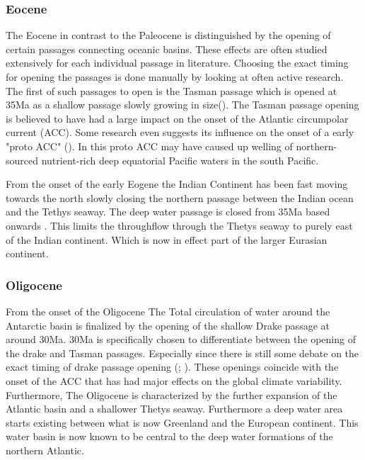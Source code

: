 \begin{multicols}{2}
\subsubsection{Eocene}
The Eocene in contrast to the Paleocene is distinguished by the opening of certain passages connecting oceanic basins. These effects are often studied extensively for each individual passage in literature. Choosing the exact timing for opening the passages is done manually by looking at often active research. The first of such passages to open is the Tasman passage which is opened at 35Ma as a shallow passage slowly growing in size(\cite{Lawver2003Sep}). The Tasman passage opening is believed to have had a large impact on the onset of the Atlantic circumpolar current (ACC). Some research even suggests its influence on the onset of a early "proto ACC" (\cite{Sarkar2019Jul}). In this proto ACC may have caused up welling of northern-sourced nutrient-rich deep equatorial Pacific waters in the south Pacific.

From the onset of the early Eogene the Indian Continent has been fast moving towards the north slowly closing the northern passage between the Indian ocean and the Tethys seaway. The deep water passage is closed from 35Ma based onwards \cite{Najman2010Dec}. This limits the throughflow through the Thetys seaway to purely east of the Indian continent. Which is now in effect part of the larger Eurasian continent. 

\subsubsection{Oligocene}
From the onset of the Oligocene The Total circulation of water around the Antarctic basin is finalized by the opening of the shallow Drake passage at around 30Ma. 30Ma is specifically chosen to differentiate between the opening of the drake and Tasman passages. Especially since there is still some debate on the exact timing of drake passage opening (\cite{Scher2006Apr}; \cite{Livermore2005Jul}). These openings coincide with the onset of the ACC that has had major effects on the global climate variability. Furthermore, The Oligocene is characterized by the further expansion of the Atlantic basin and a shallower Thetys seaway. Furthermore a deep water area starts existing between what is now Greenland and the European continent. This water basin is now known to be central to the deep water formations of the northern Atlantic.
\end{multicols}

